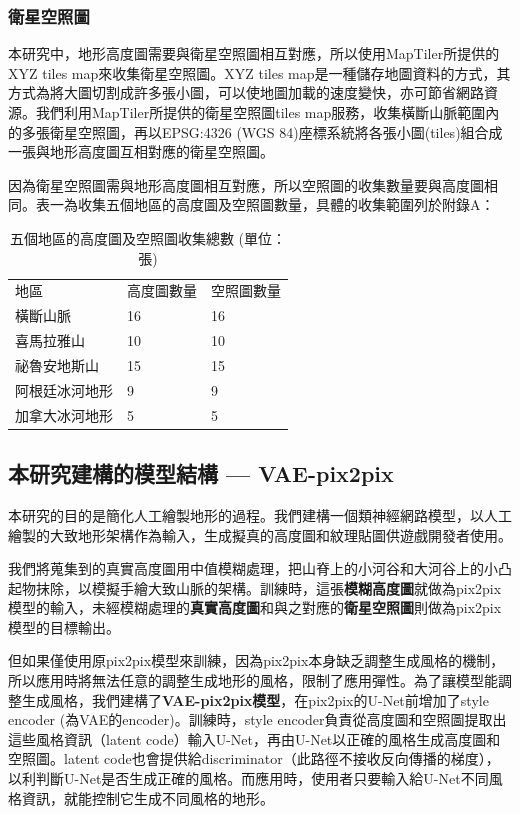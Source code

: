 \documentclass[a4paper, 12pt]{article}
\begin{document}
\subsubsection{衛星空照圖}
本研究中，地形高度圖需要與衛星空照圖相互對應，所以使用MapTiler所提供的XYZ tiles map來收集衛星空照圖。XYZ tiles map是一種儲存地圖資料的方式，其方式為將大圖切割成許多張小圖，可以使地圖加載的速度變快，亦可節省網路資源。我們利用MapTiler所提供的衛星空照圖tiles map服務，收集橫斷山脈範圍內的多張衛星空照圖，再以EPSG:4326 (WGS 84)座標系統將各張小圖(tiles)組合成一張與地形高度圖互相對應的衛星空照圖。

因為衛星空照圖需與地形高度圖相互對應，所以空照圖的收集數量要與高度圖相同。表一為收集五個地區的高度圖及空照圖數量，具體的收集範圍列於附錄A：

\begin{table}[H]
    \centering
    \caption{五個地區的高度圖及空照圖收集總數 (單位：張)}
    \begin{tabularx}{\linewidth}{|Y|Y|Y|}
        \hline
        地區           & 高度圖數量 & 空照圖數量 \\ \hhline{|=|=|=|}
        橫斷山脈       & 16         & 16         \\ \hline
        喜馬拉雅山     & 10         & 10         \\ \hline
        祕魯安地斯山   & 15         & 15         \\ \hline
        阿根廷冰河地形 & 9          & 9          \\ \hline
        加拿大冰河地形 & 5          & 5          \\ \hline
    \end{tabularx}
    \label{tab:2}
\end{table}

\subsection{本研究建構的模型結構 — VAE-pix2pix}
本研究的目的是簡化人工繪製地形的過程。我們建構一個類神經網路模型，以人工繪製的大致地形架構作為輸入，生成擬真的高度圖和紋理貼圖供遊戲開發者使用。

我們將蒐集到的真實高度圖用中值模糊處理，把山脊上的小河谷和大河谷上的小凸起物抹除，以模擬手繪大致山脈的架構。訓練時，這張\textbf{模糊高度圖}就做為pix2pix模型的輸入，未經模糊處理的\textbf{真實高度圖}和與之對應的\textbf{衛星空照圖}則做為pix2pix模型的目標輸出。

但如果僅使用原pix2pix模型來訓練，因為pix2pix本身缺乏調整生成風格的機制，所以應用時將無法任意的調整生成地形的風格，限制了應用彈性。為了讓模型能調整生成風格，我們建構了\textbf{VAE-pix2pix模型}，在pix2pix的U-Net前增加了style encoder (為VAE的encoder)。訓練時，style encoder負責從高度圖和空照圖提取出這些風格資訊（latent code）輸入U-Net，再由U-Net以正確的風格生成高度圖和空照圖。latent code也會提供給discriminator（此路徑不接收反向傳播的梯度），以利判斷U-Net是否生成正確的風格。而應用時，使用者只要輸入給U-Net不同風格資訊，就能控制它生成不同風格的地形。
\end{document}
